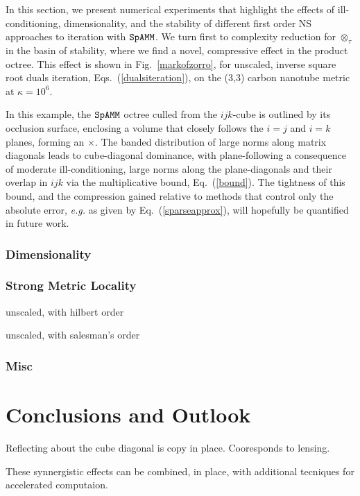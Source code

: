 \documentclass[letterpaper,twocolumn,amsmath,amsfont,amssymb,english,aps,jcp,preprintnumbers,groupaddress,nofootinbib,tightenlines,floatfix]{revtex4}
\newcommand{\ot}{  {\scriptstyle \otimes}_{ \tau } }
\theoremstyle{plain}
\theoremstyle{remark}
\theoremstyle{plain}
\begin{document}
In this section, we present  numerical experiments that highlight the effects of 
ill-conditioning, dimensionality, and the stability of different first order NS approaches to iteration with $\tt SpAMM$. 
We turn first to complexity reduction for $\ot$ in the basin of stability,  where we find a novel, compressive 
effect in the product octree.  This effect is shown in Fig.~\ref{markofzorro},  
for unscaled, inverse square root duals iteration, Eqs.~(\ref{dualsiteration}), on the (3,3) carbon 
nanotube metric at $\kappa=10^6$.  

In this example, the $\tt SpAMM$ octree culled from the $ijk$-cube is outlined by its occlusion surface, enclosing 
a volume that closely follows the $i=j$ and $i=k$ planes, forming an $\times$.  The banded distribution
of large norms along  matrix diagonals leads to cube-diagonal dominance, with plane-following 
a consequence of moderate ill-conditioning,  large norms along the plane-diagonals and their overlap in $ijk$
via the multiplicative bound, Eq.~(\ref{bound}). The tightness of this bound, and the compression gained relative
to  methods that control only the absolute error, {\em e.g.} as given by Eq.~(\ref{sparseapprox}), will hopefully
be quantified in future work. 

\subsubsection{Dimensionality}

\subsubsection{Strong Metric Locality}

unscaled, with hilbert order

unscaled, with salesman's order

\subsubsection{Misc}





\section{Conclusions and Outlook}

Reflecting about the cube diagonal is copy in place.  Cooresponds to lensing.

These  synnergistic effects can be combined, in place, with additional tecniques for 
accelerated computaion.



\end{document}

